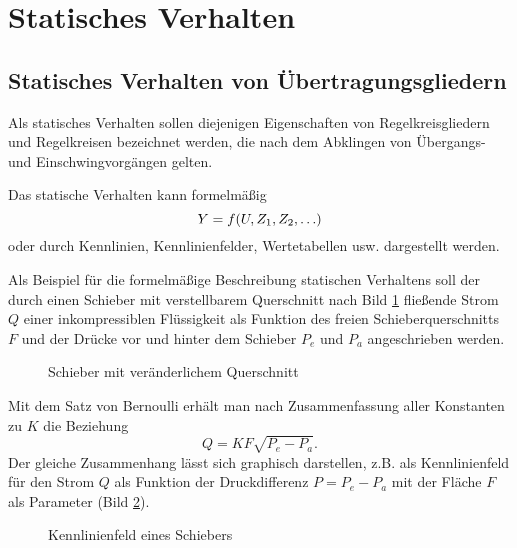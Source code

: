 \section{Statisches Verhalten}


\subsection{Statisches Verhalten von Übertragungsgliedern}

Als statisches Verhalten sollen diejenigen Eigenschaften von Regelkreisgliedern und Regelkreisen bezeichnet werden, die nach dem Abklingen von Übergangs- und Einschwingvorgängen gelten.

Das statische Verhalten kann formelmäßig
\begin{equation}\label{eq:2-1}
    Y = f\parentheses*{U, Z_1, Z_2, \ldots}
\end{equation}
oder durch Kennlinien, Kennlinienfelder, Wertetabellen usw. dargestellt werden.

Als Beispiel für die formelmäßige Beschreibung statischen Verhaltens soll der durch einen Schieber mit verstellbarem Querschnitt nach Bild \ref{fig:2-1} fließende Strom \(Q\) einer inkompressiblen Flüssigkeit als Funktion des freien Schieberquerschnitts \(F\) und der Drücke vor und hinter dem Schieber \(P_e\) und \(P_a\) angeschrieben werden.

\begin{figure}[h]
    \centering
    \caption{Schieber mit veränderlichem Querschnitt}
    \label{fig:2-1}
\end{figure}

Mit dem Satz von Bernoulli erhält man nach Zusammenfassung aller Konstanten zu \(K\) die Beziehung
\begin{equation}
    Q = KF\sqrt{P_e - P_a}.
\end{equation}
Der gleiche Zusammenhang lässt sich graphisch darstellen, z.B. als Kennlinienfeld für den Strom \(Q\) als Funktion der Druckdifferenz \(P = P_e - P_a\) mit der Fläche \(F\) als Parameter (Bild \ref{fig:2-2}).

\begin{figure}[h]
    \centering
    \caption{Kennlinienfeld eines Schiebers}
    \label{fig:2-2}
\end{figure}



